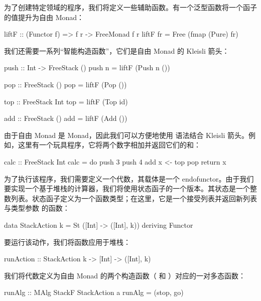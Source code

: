 \documentclass[DaoFP]{subfiles}
\begin{document}
    为了创建特定领域的程序，我们将定义一些辅助函数。有一个泛型函数将一个函子的值提升为自由 Monad：

    \begin{haskell}
        liftF :: (Functor f) => f r -> FreeMonad f r
        liftF fr = Free (fmap (Pure) fr)
    \end{haskell}

    我们还需要一系列“智能构造函数”，它们是自由 Monad 的 Kleisli 箭头：

    \begin{haskell}
        push :: Int -> FreeStack ()
        push n = liftF (Push n ())

        pop :: FreeStack ()
        pop = liftF (Pop ())

        top :: FreeStack Int
        top = liftF (Top id)

        add :: FreeStack ()
        add = liftF (Add ())
    \end{haskell}

    由于自由 Monad 是 Monad，因此我们可以方便地使用  语法结合 Kleisli 箭头。例如，这里有一个玩具程序，它将两个数字相加并返回它们的和：

    \begin{haskell}
        calc :: FreeStack Int
        calc = do
        push 3
        push 4
        add
        x <- top
        pop
        return x
    \end{haskell}

    为了执行该程序，我们需要定义一个代数，其载体是一个 endofunctor。由于我们要实现一个基于堆栈的计算器，我们将使用状态函子的一个版本。其状态是一个整数列表。状态函子定义为一个函数类型；在这里，它是一个接受列表并返回新列表与类型参数  的函数：

    \begin{haskell}
        data StackAction k = St ([Int] -> ([Int], k))
        deriving Functor
    \end{haskell}

    要运行该动作，我们将函数应用于堆栈：

    \begin{haskell}
        runAction :: StackAction k -> [Int] -> ([Int], k)
    \end{haskell}

    我们将代数定义为自由 Monad 的两个构造函数（ 和 ）对应的一对多态函数：

    \begin{haskell}
        runAlg :: MAlg StackF StackAction a
        runAlg = (stop, go)
    \end{haskell}
\end{document}
